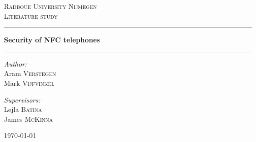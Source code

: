 \begin{titlepage}
\begin{center}
\textsc{\LARGE Radboue University Nijmegen}\\[1.5cm]
\textsc{\Large Literature study}\\[1.5cm]
\hrule \vspace{0.4cm}
{\huge \bfseries Security of NFC telephones } \\[0.4cm]
\hrule \vspace{1.5cm}

\vspace{2.5cm}
\begin{minipage}{0.4\textwidth}
\begin{flushleft} \large
\emph{Author:}\\
Aram \textsc{Verstegen} \\
Mark \textsc{Vijfvinkel}
\vspace{0.57cm}
\end{flushleft}
\end{minipage}
\begin{minipage}{0.4\textwidth}
\begin{flushright} \large
\emph{Supervisors:} \\
Lejla \textsc{Batina} \\
James \textsc{McKinna}
\end{flushright}
\end{minipage}

 
\vfill

{\large \today}

\end{center}
\end{titlepage}
